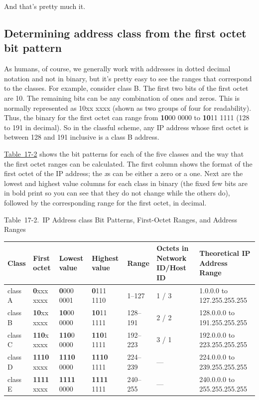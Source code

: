 And that's pretty much it.



\subsection{Determining address class from the first octet bit pattern}

As humans, of course, we generally work with addresses in dotted decimal
notation and not in binary, but it's pretty easy to see the ranges that
correspond to the classes. For example, consider class B. The first two
bits of the first octet are 10. The remaining bits can be any
combination of ones and zeros. This is normally represented as 10xx xxxx
(shown as two groups of four for readability). Thus, the binary for the
first octet can range from {\textbf{10}}00 0000 to {\textbf{10}}11 1111
(128 to 191 in decimal). So in the classful scheme, any IP address whose
first octet is between 128 and 191 inclusive is a class B address.

\protect\hyperlink{ch17s02.htmlux5cux23ip_address_class_bit_patterns_first-octe}{Table~17-2}
shows the bit patterns for each of the five classes and the way that the first octet
ranges can be calculated. The first column shows the format of the first
octet of the IP address; the {\emph{x}}s can be either a zero or a one.
Next are the lowest and highest value columns for each class in binary
(the fixed few bits are in bold print so you can see that they do not
change while the others do), followed by the corresponding range for the
first octet, in decimal.

\protect\hypertarget{ch17s02.htmlux5cux23ip_address_class_bit_patterns_first-octe}{}{}

Table~17-2.~IP Address class Bit Patterns, First-Octet Ranges, and
Address Ranges

\begin{longtable}[]{@{}lllllll@{}}
\toprule
Class & First octet & Lowest value & Highest value & Range & Octets in Network ID/Host ID & Theoretical IP Address Range\tabularnewline
\midrule
\endhead
class A & \textbf{0}xxx xxxx & {\textbf{0}}000 0001 & {\textbf{0}}111 1110 & 1--127 & 1 / 3 & 1.0.0.0 to 127.255.255.255\\
class B & \textbf{10}xx xxxx & {\textbf{10}}00 0000 & {\textbf{10}}11 1111 & 128--191 & 2 / 2 & 128.0.0.0 to 191.255.255.255\\
class C & \textbf{110}x xxxx & {\textbf{110}}0 0000 & {\textbf{110}}1 1111 & 192--223 & 3 / 1 & 192.0.0.0 to 223.255.255.255\\
class D & \textbf{1110} xxxx & {\textbf{1110}} 0000 & {\textbf{1110}} 1111 & 224--239 & --- & 224.0.0.0 to 239.255.255.255\\
class E & \textbf{1111} xxxx & {\textbf{1111}} 0000 & {\textbf{1111}} 1111 & 240--255 & --- & 240.0.0.0 to 255.255.255.255\\
\bottomrule
\end{longtable}

